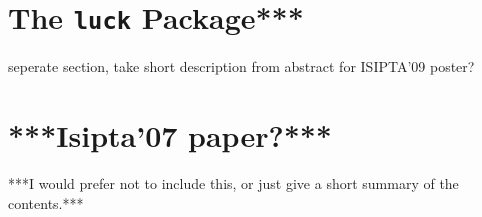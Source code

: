 

\section{The \texttt{luck} Package***} %

seperate section, take short description from abstract for ISIPTA'09 poster?


\section{***Isipta'07 paper?***}


***I would prefer not to include this, or just give a short summary of the contents.***



